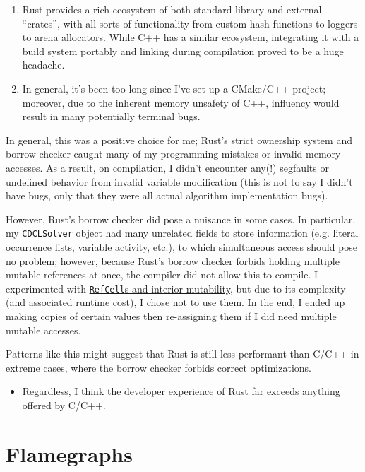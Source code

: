 \documentclass[11pt]{article}
\begin{document}
\begin{enumerate}
    \item Rust provides a rich ecosystem of both standard library and external ``crates'', with
        all sorts of functionality from custom hash functions to loggers to arena allocators. While
        C++ has a similar ecosystem, integrating it with a build system portably and linking during
        compilation proved to be a huge headache.
    \item In general, it's been too long since I've set up a CMake/C++ project; moreover, due to the
        inherent memory unsafety of C++, influency would result in many potentially terminal bugs.
\end{enumerate}

In general, this was a positive choice for me; Rust's strict ownership system and borrow checker
caught many of my programming mistakes or invalid memory accesses. As a result, on compilation, I
didn't encounter any(!) segfaults or undefined behavior from invalid variable modification (this is
not to say I didn't have bugs, only that they were all actual algorithm implementation bugs).

However, Rust's borrow checker did pose a nuisance in some cases. In particular, my
\texttt{CDCLSolver} object had many unrelated fields to store information (e.g. literal occurrence
lists, variable activity, etc.), to which simultaneous access should pose no problem; however,
because Rust's borrow checker forbids holding multiple mutable references at once, the compiler did
not allow this to compile. I experimented with
\href{https://doc.rust-lang.org/book/ch15-05-interior-mutability.html}{\texttt{RefCell}s and
interior mutability}, but due to its complexity (and associated runtime cost), I chose not to use
them. In the end, I ended up making copies of certain values then re-assigning them if I did need
multiple mutable accesses.

Patterns like this might suggest that Rust is still less performant than C/C++ in extreme cases,
where the borrow checker forbids correct optimizations.
\begin{itemize}
    \item Regardless, I think the developer experience of Rust far exceeds anything offered by
        C/C++.
\end{itemize}

\section{Flamegraphs}\label{app:fg}
\end{document}
